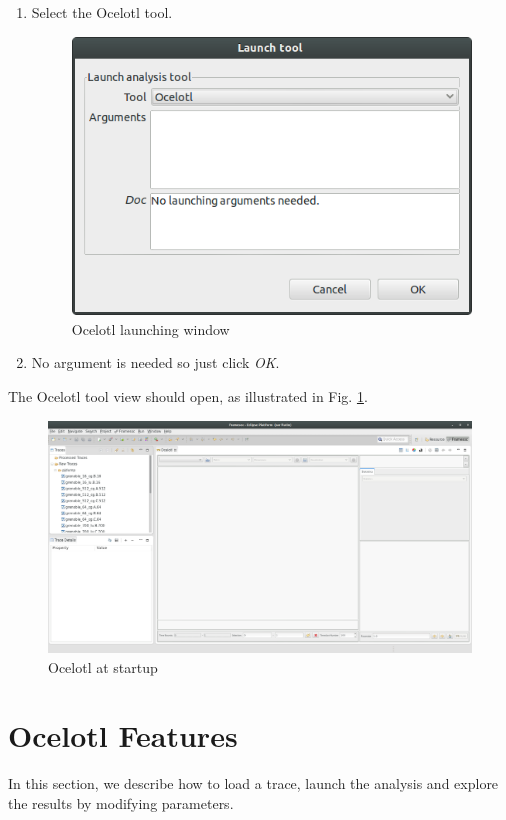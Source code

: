 \documentclass[twoside]{article}
\begin{document}
\begin{sloppypar}
\begin{enumerate}
	\item Select the Ocelotl tool.
	\begin{figure}[h!]
		\centering
		\includegraphics[scale=0.5]{images/launch_tool.png}
		\caption{Ocelotl launching window}
	\end{figure}
	\item No argument is needed so just click \textit{OK}.
\end{enumerate}

The Ocelotl tool view should open, as illustrated in Fig. \ref{ocelotlOverview}.
\begin{figure}[h!]
	\centering
	\includegraphics[width=1.0\textwidth]{images/ocelotl_startup.png}
	\caption{Ocelotl at startup}
	\label{ocelotlOverview}
\end{figure}


\section{Ocelotl Features}
In this section, we describe how to load a trace, launch the analysis and explore the results by modifying parameters. 


\end{sloppypar}
\end{document}
